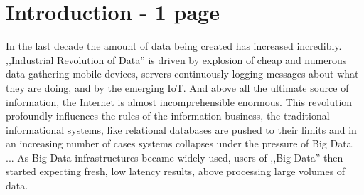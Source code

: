 



\section{Introduction - 1 page}
In the last decade the amount of data being created has increased incredibly.  
,,Industrial Revolution of Data''\cite{aobd} is driven by explosion of cheap and numerous data gathering mobile devices, servers continuously 
logging messages about what they are doing, and by the emerging IoT. And above all the ultimate source of information, the Internet is almost incomprehensible 
enormous.
This revolution profoundly influences the rules of the information business, the traditional informational systems, 
like relational databases are pushed to their limits and in an increasing number of cases systems collapses under the pressure of Big Data.\cite{marz}
...
As Big Data infrastructures became widely used, users of ,,Big Data'' then started expecting fresh, low latency results, above processing large volumes of data. 

